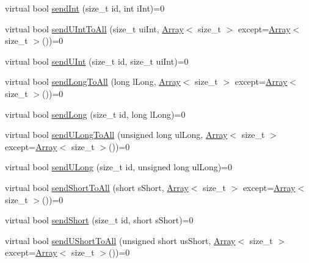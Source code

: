\begin{DoxyCompactItemize}
\item 
virtual bool \mbox{\hyperlink{class_rad_j_a_v_1_1_networking_1_1_tcpip_server_a30e0e41500289006ad0ac4a8db803978}{send\+Int}} (size\+\_\+t id, int i\+Int)=0
\item 
virtual bool \mbox{\hyperlink{class_rad_j_a_v_1_1_networking_1_1_tcpip_server_ab6768866944867f365b7a006f897838a}{send\+U\+Int\+To\+All}} (size\+\_\+t ui\+Int, \mbox{\hyperlink{class_rad_j_a_v_1_1_array}{Array}}$<$ size\+\_\+t $>$ except=\mbox{\hyperlink{class_rad_j_a_v_1_1_array}{Array}}$<$ size\+\_\+t $>$())=0
\item 
virtual bool \mbox{\hyperlink{class_rad_j_a_v_1_1_networking_1_1_tcpip_server_a69c51983234182cde5e657b6445c9e82}{send\+U\+Int}} (size\+\_\+t id, size\+\_\+t ui\+Int)=0
\item 
virtual bool \mbox{\hyperlink{class_rad_j_a_v_1_1_networking_1_1_tcpip_server_a54e65701f913a800034b8eca4a16e5eb}{send\+Long\+To\+All}} (long l\+Long, \mbox{\hyperlink{class_rad_j_a_v_1_1_array}{Array}}$<$ size\+\_\+t $>$ except=\mbox{\hyperlink{class_rad_j_a_v_1_1_array}{Array}}$<$ size\+\_\+t $>$())=0
\item 
virtual bool \mbox{\hyperlink{class_rad_j_a_v_1_1_networking_1_1_tcpip_server_a02d65d1ce114f23a84fc289eddda8f7d}{send\+Long}} (size\+\_\+t id, long l\+Long)=0
\item 
virtual bool \mbox{\hyperlink{class_rad_j_a_v_1_1_networking_1_1_tcpip_server_a3a7c5f60b92fd1cf44f7b2dcc95dd853}{send\+U\+Long\+To\+All}} (unsigned long ul\+Long, \mbox{\hyperlink{class_rad_j_a_v_1_1_array}{Array}}$<$ size\+\_\+t $>$ except=\mbox{\hyperlink{class_rad_j_a_v_1_1_array}{Array}}$<$ size\+\_\+t $>$())=0
\item 
virtual bool \mbox{\hyperlink{class_rad_j_a_v_1_1_networking_1_1_tcpip_server_af4220826c049f042293bce081ec27b94}{send\+U\+Long}} (size\+\_\+t id, unsigned long ul\+Long)=0
\item 
virtual bool \mbox{\hyperlink{class_rad_j_a_v_1_1_networking_1_1_tcpip_server_a01f6b4d1a26490f540bdf1c070b0e2e0}{send\+Short\+To\+All}} (short s\+Short, \mbox{\hyperlink{class_rad_j_a_v_1_1_array}{Array}}$<$ size\+\_\+t $>$ except=\mbox{\hyperlink{class_rad_j_a_v_1_1_array}{Array}}$<$ size\+\_\+t $>$())=0
\item 
virtual bool \mbox{\hyperlink{class_rad_j_a_v_1_1_networking_1_1_tcpip_server_a5c68d2ad228feeaa3a9f8c8c049193e0}{send\+Short}} (size\+\_\+t id, short s\+Short)=0
\item 
virtual bool \mbox{\hyperlink{class_rad_j_a_v_1_1_networking_1_1_tcpip_server_afa2c3dc49d91e9205d6b814266fa8d0e}{send\+U\+Short\+To\+All}} (unsigned short us\+Short, \mbox{\hyperlink{class_rad_j_a_v_1_1_array}{Array}}$<$ size\+\_\+t $>$ except=\mbox{\hyperlink{class_rad_j_a_v_1_1_array}{Array}}$<$ size\+\_\+t $>$())=0

\end{DoxyCompactItemize}
